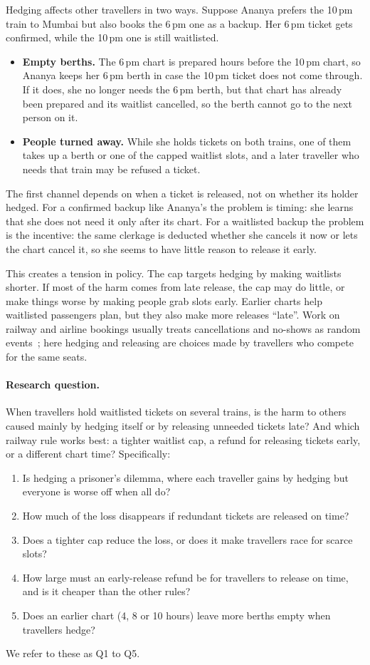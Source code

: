 \documentclass{article}
\theoremstyle{definition}
\begin{document}
Hedging affects other travellers in two ways. Suppose Ananya prefers the 10\,pm train to
Mumbai but also books the 6\,pm one as a backup. Her 6\,pm ticket gets confirmed, while the
10\,pm one is still waitlisted.
\begin{itemize}
\item \textbf{Empty berths.} The 6\,pm chart is prepared hours before the 10\,pm chart, so
Ananya keeps her 6\,pm berth in case the 10\,pm ticket does not come through. If it does,
she no longer needs the 6\,pm berth, but that chart has already been prepared and its
waitlist cancelled, so the berth cannot go to the next person on it.
\item \textbf{People turned away.} While she holds tickets on both trains, one of them
takes up a berth or one of the capped waitlist slots, and a later traveller who needs that
train may be refused a ticket.
\end{itemize}
The first channel depends on when a ticket is released, not on whether its holder hedged.
For a confirmed backup like Ananya's the problem is timing: she learns that she does not
need it only after its chart. For a waitlisted backup the problem is the incentive: the
same clerkage is deducted whether she cancels it now or lets the chart cancel it, so she
seems to have little reason to release it early.

This creates a tension in policy. The cap targets hedging by making waitlists shorter. If
most of the harm comes from late release, the cap may do little, or make things worse by
making people grab slots early. Earlier charts help waitlisted passengers plan, but they
also make more releases ``late''. Work on railway and airline bookings usually treats
cancellations and no-shows as random events~\cite{talluri}; here hedging and releasing are
choices made by travellers who compete for the same seats.

\paragraph{Research question.} When travellers hold waitlisted tickets on several trains,
is the harm to others caused mainly by hedging itself or by releasing unneeded tickets
late? And which railway rule works best: a tighter waitlist cap, a refund for releasing
tickets early, or a different chart time? Specifically:
\begin{enumerate}
\item Is hedging a prisoner's dilemma, where each traveller gains by hedging but everyone
is worse off when all do?
\item How much of the loss disappears if redundant tickets are released on time?
\item Does a tighter cap reduce the loss, or does it make travellers race for scarce slots?
\item How large must an early-release refund be for travellers to release on time, and is
it cheaper than the other rules?
\item Does an earlier chart (4, 8 or 10 hours) leave more berths empty when travellers
hedge?
\end{enumerate}
We refer to these as Q1 to Q5.
\end{document}

